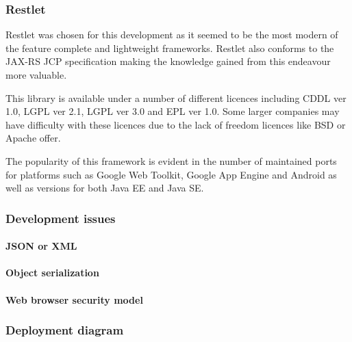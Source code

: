 \documentclass[pdftex,11pt,a4paper]{article}
\begin{document}
\subsubsection{Restlet}
Restlet was chosen for this development as it seemed to be the most modern of the feature complete and lightweight frameworks. Restlet also conforms to the JAX-RS JCP specification\cite{website:jax-rs_jcp} making the knowledge gained from this endeavour more valuable.

This library is available under a number of different licences including CDDL ver 1.0, LGPL ver 2.1, LGPL ver 3.0 and EPL ver 1.0. Some larger companies may have difficulty with these licences due to the lack of freedom licences like BSD or Apache offer.

The popularity of this framework is evident in the number of maintained ports for platforms such as Google Web Toolkit, Google App Engine and Android as well as versions for both Java EE and Java SE.

\subsubsection{Development issues}

 \paragraph{JSON or XML}

 \paragraph{Object serialization}

 \paragraph{Web browser security model}

\subsubsection{Deployment diagram}


\pagebreak


\def\refname{}


\end{document}
